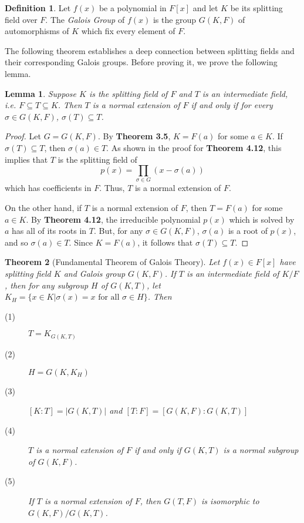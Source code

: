 \documentclass[12pt,leqno]{article}
\numberwithin{equation}{section}
\theoremstyle{plain}
\newtheorem{thm}{Theorem}[section]
\newtheorem{lem}[thm]{Lemma}
\theoremstyle{definition}
\newtheorem*{Def}{Definition}
\theoremstyle{remark}
\begin{document}
\begin{Def}
 Let $f(x)$ be a polynomial in $F[x]$ and let $K$ be its splitting field over $F$. The \textit{Galois Group} of $f(x)$ is the group $G(K,F)$ of automorphisms of $K$ which fix every element of $F$.
\end{Def}

The following theorem establishes a deep connection between splitting fields and their corresponding Galois groups. Before proving it, we prove the following lemma.

\begin{lem}
 Suppose $K$ is the splitting field of $F$ and $T$ is an intermediate field, i.e. $F\subseteq T\subseteq K$. Then $T$ is a normal extension of $F$ if and only if for every $\sigma\in G(K,F)$, $\sigma(T)\subseteq T$. 
\end{lem}

\begin{proof}
 Let $G=G(K,F)$. By \textbf{Theorem 3.5}, $K=F(a)$ for some $a\in K$. If $\sigma(T)\subseteq T$, then $\sigma(a)\in T$. As shown in the proof for \textbf{Theorem 4.12}, this implies that $T$ is the splitting field of \[p(x)=\prod_{\sigma\in G}(x-\sigma(a))\] which has coefficients in $F$. Thus, $T$ is a normal extension of $F$.

On the other hand, if $T$ is a normal extension of $F$, then $T=F(a)$ for some $a\in K$. By \textbf{Theorem 4.12}, the irreducible polynomial $p(x)$ which is solved by $a$ has all of its roots in $T$. But, for any $\sigma\in G(K,F)$, $\sigma(a)$ is a root of $p(x)$, and so $\sigma(a)\in T$. Since $K=F(a)$, it follows that $\sigma(T)\subseteq T$.
\end{proof}


\begin{thm}[Fundamental Theorem of Galois Theory]
 Let $f(x)\in F[x]$ have splitting field $K$ and Galois group $G(K,F)$. If $T$ is an intermediate field of $K/F$, then for any subgroup $H$ of $G(K,T)$, let $K_H=\{x\in K|\sigma(x)=x\text{ for all }\sigma\in H\}$. Then
\begin{description}
 \item [(1)] $T=K_{G(K,T)}$
 \item [(2)] $H=G(K,K_H)$
 \item [(3)] $[K:T]=|G(K,T)|$ and $[T:F]=[G(K,F):G(K,T)]$
 \item [(4)] $T$ is a normal extension of $F$ if and only if $G(K,T)$ is a normal subgroup of $G(K,F)$.
 \item [(5)] If $T$ is a normal extension of $F$, then $G(T,F)$ is isomorphic to $G(K,F)/G(K,T)$.
\end{description}
\end{thm}
\end{document}
